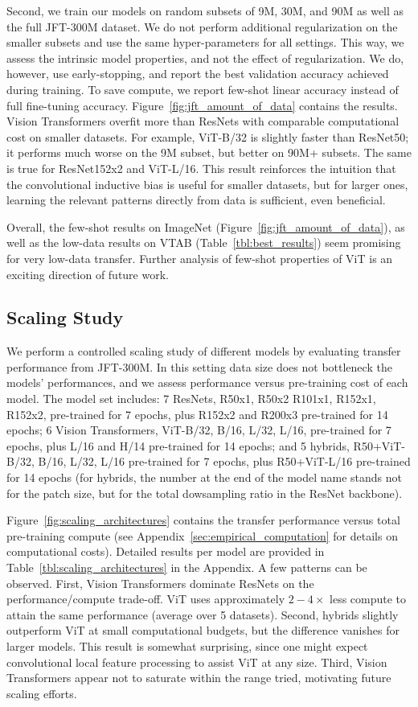 Second, we train our models on random subsets of 9M, 30M, and 90M as well as the full JFT-300M dataset. We do not perform additional regularization on the smaller subsets and use the same hyper-parameters for all settings. This way, we assess the intrinsic model properties, and not the effect of regularization. We do, however, use early-stopping, and report the best validation accuracy achieved during training. To save compute, we report few-shot linear accuracy instead of full fine-tuning accuracy.
Figure~\ref{fig:jft_amount_of_data} contains the results. Vision Transformers overfit more than ResNets with comparable computational cost on smaller datasets. For example, ViT-B/32 is slightly faster than ResNet50; it performs much worse on the 9M subset, but better on 90M+ subsets. The same is true for ResNet152x2 and ViT-L/16. This result reinforces the intuition that the convolutional inductive bias is useful for smaller datasets, but for larger ones, learning the relevant patterns directly from data is sufficient, even beneficial.

Overall, the few-shot results on ImageNet (Figure~\ref{fig:jft_amount_of_data}), as well as the low-data results on VTAB (Table~\ref{tbl:best_results}) seem promising for very low-data transfer. Further analysis of few-shot properties of ViT is an exciting direction of future work.

\subsection{Scaling Study}
\label{sec:scaling_architectures}

We perform a controlled scaling study of different models by evaluating transfer performance from JFT-300M. In this setting data size does not bottleneck the models' performances, and we assess performance versus pre-training cost of each model. The model set includes: 7 ResNets, R50x1, R50x2 R101x1, R152x1, R152x2, pre-trained for 7 epochs, plus R152x2 and R200x3 pre-trained for 14 epochs; 6 Vision Transformers, ViT-B/32, B/16, L/32, L/16, pre-trained for 7 epochs, plus L/16 and H/14 pre-trained for 14 epochs; and 5 hybrids, R50+ViT-B/32, B/16, L/32, L/16 pre-trained for 7 epochs, plus R50+ViT-L/16 pre-trained for 14 epochs (for hybrids, the number at the end of the model name stands not for the patch size, but for the total dowsampling ratio in the ResNet backbone).

Figure~\ref{fig:scaling_architectures} contains the transfer performance versus  total pre-training compute (see  Appendix~\ref{sec:empirical_computation} for details on computational costs). Detailed results per model are provided in Table~\ref{tbl:scaling_architectures} in the Appendix. A few patterns can be observed. First, Vision Transformers dominate ResNets on the performance/compute trade-off. ViT uses approximately $2-4\times$ less compute to attain the same performance (average over 5 datasets). Second, hybrids slightly outperform ViT at small computational budgets, but the difference vanishes for larger models. This result is somewhat surprising, since one might expect convolutional local feature processing to assist ViT at any size. Third, Vision Transformers appear not to saturate within the range tried, motivating future scaling efforts.

